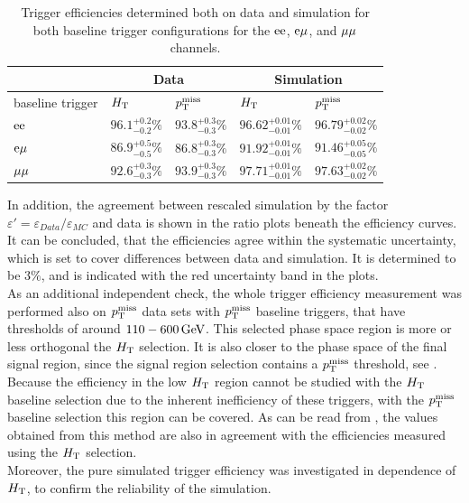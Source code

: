 \begin{table}[htb]
 \centering
 \caption{Trigger efficiencies determined both on data and simulation for both baseline trigger
  configurations for the $\mathrm{e}\mathrm{e}$, $\mathrm{e}{\mu}$, and ${\mu}{\mu}$ channels.}
 \label{tab:triggEff}
 \begin{tabular}{lllll}
                   & \multicolumn{2}{c}{Data} & \multicolumn{2}{c}{Simulation}                                                         \\\hline
  baseline trigger & $H_{\mathrm{T}}$                    & $p_{\mathrm{T}}^\text{miss}$                      & $H_{\mathrm{T}}$                     & $p_{\mathrm{T}}^\text{miss}$                 \\\hline
  $\mathrm{e}\mathrm{e}$         & $96.1^{+0.2}_{-0.2}\%$   & $93.8^{+0.3}_{-0.3}\%$         & $96.62^{+0.01}_{-0.01}\%$ & $96.79^{+0.02}_{-0.02}\%$ \\
  $\mathrm{e}{\mu}$        & $86.9^{+0.5}_{-0.5}\%$   & $86.8^{+0.3}_{-0.3}\%$         & $91.92^{+0.01}_{-0.01}\%$ & $91.46^{+0.05}_{-0.05}\%$ \\
  ${\mu}{\mu}$       & $92.6^{+0.3}_{-0.3}\%$   & $93.9^{+0.3}_{-0.3}\%$         & $97.71^{+0.01}_{-0.01}\%$ & $97.63^{+0.02}_{-0.02}\%$ \\\hline
 \end{tabular}
\end{table}


In addition, the agreement between rescaled simulation by the factor $\varepsilon'=\varepsilon_{Data}/\varepsilon_{MC}$ and data is shown in the ratio plots beneath the efficiency curves. It can be concluded, that the efficiencies agree within the systematic uncertainty, which is set to cover differences between data and simulation. It is determined to be $3\%$, and is indicated with the red uncertainty band in the plots.\\

As an additional independent check, the whole trigger efficiency measurement was performed also on $p_{\mathrm{T}}^\text{miss}$ data sets with $p_{\mathrm{T}}^\text{miss}$ baseline triggers, that have thresholds of around $110-600\,\text{Ge\hspace{-.08em}V}$. This selected phase space region is more or less orthogonal the $H_{\mathrm{T}}$ selection. It is also closer to the phase space of the final signal region, since the signal region selection contains a $p_{\mathrm{T}}^\text{miss}$ threshold, see . Because the efficiency in the low $H_{\mathrm{T}}$ region cannot be studied with the $H_{\mathrm{T}}$ baseline selection due to the inherent inefficiency of these triggers, with the $p_{\mathrm{T}}^\text{miss}$ baseline selection this region can be covered. As can be read from , the values obtained from this method are also in agreement with the efficiencies measured using the $H_{\mathrm{T}}$ selection.\\
Moreover, the pure simulated trigger efficiency was investigated in dependence of $H_{\mathrm{T}}$, to confirm the reliability of the simulation.
